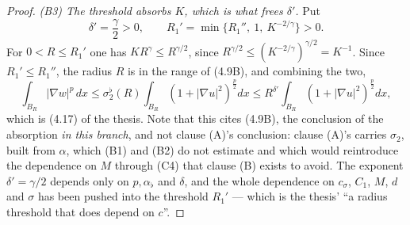 \begin{proof}
\emph{(B3) The threshold absorbs $K$, which is what frees $\delta'$.}  Put
\[
\delta'=\frac\gamma2>0,
\qquad
R_1'=\min\bigl\{R_1'',\ 1,\ K^{-2/\gamma}\bigr\}>0 .
\]
For $0<R\le R_1'$ one has $KR^{\gamma}\le R^{\gamma/2}$, since
$R^{\gamma/2}\le(K^{-2/\gamma})^{\gamma/2}=K^{-1}$.  Since $R_1'\le R_1''$, the
radius $R$ is in the range of (4.9B), and combining the two,
\[
\int_{B_R}|\nabla w|^p\,dx\le\sigma_2^{\flat}(R)
\int_{B_R}(1+|\nabla u|^2)^{\frac p2}dx
\le R^{\delta'}\int_{B_R}(1+|\nabla u|^2)^{\frac p2}dx ,
\]
which is (4.17) of the thesis.  Note that this cites (4.9B), the conclusion of
the absorption \emph{in this branch}, and not clause (A)'s conclusion: clause
(A)'s carries $\sigma_2$, built from $\alpha$, which (B1) and (B2) do not
estimate and which would reintroduce the dependence on $M$ through (C4) that
clause (B) exists to avoid.  The exponent $\delta'=\gamma/2$ depends only on
$p,\alpha_\flat$ and $\delta$, and the whole dependence on $c_\sigma$, $C_1$,
$M$, $d$ and $\sigma$ has been pushed into the threshold $R_1'$ --- which is the
thesis' ``a radius threshold that does depend on $c$''.
\end{proof}
